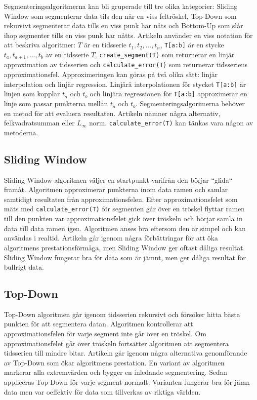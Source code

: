 \documentclass{article}
\newcommand{\tssubset}{\texttt{T[a:b]}}
\newcommand{\csegment}{\texttt{create_segment(T)}}
\newcommand{\calcerr}{\texttt{calculate_error(T)}}
\begin{document}
Segmenteringsalgoritmerna kan bli gruperade till tre olika kategorier: Sliding Window som segmenterar data tils den når en viss feltröskel, Top-Down som rekursivt segmenterar data tills en viss punk har nåts och Bottom-Up som slår ihop segmenter tills en viss punk har nåtts. Artikeln använder en viss notation för att beskriva algoritmer: $T$ är en tidsserie $t_1, t_2, ..., t_n$, \tssubset{} är en stycke $t_a, t_{a+1}, ..., t_b$ av en tidsserie $T$, \csegment{} som returnerar en linjär approximation av tidsserien och \calcerr{} som returnerar tidsseriens approximationsfel. Approximeringen kan göras på två olika sätt: linjär interpolation och linjär regression. Linjärä interpolationen för stycket \tssubset{} är linjen som kopplar $t_a$ och $t_b$ och linjära regressionen för \tssubset{} approximerar en linje som passar punkterna mellan $t_a$ och $t_b$. Segmenteringsalgorimerna behöver en metod för att evaluera resultaten. Artikeln nämner några alternativ, felkvadratsumman eller $L_\infty$ norm. \calcerr{} kan tänkas vara någon av metoderna.
\bigskip

\subsection{Sliding Window}

Sliding Window algoritmen väljer en startpunkt varifrån den börjar ``glida`` framåt. Algoritmen approximerar punkterna inom data ramen och samlar samtidigt resultaten från approximationsfelen. Efter approximationsfelet som mäts med \calcerr{} för segmenten går över en tröskel flyttar ramen till den punkten var approximationsfelet gick över tröskeln och börjar samla in data till data ramen igen. Algoritmen anses bra eftersom den är simpel och kan användas i realtid. Artikeln går igenom några förbättringar för att öka algoritmens prestationsförmåga, men Sliding Window ger oftast dåliga resultat. Sliding Window fungerar bra för data som är jämnt, men ger dåliga resultat för bullrigt data.

\subsection{Top-Down}

Top-Down algoritmen går igenom tidsserien rekursivt och försöker hitta bästa punkten för att segmentera datan. Algoritmen kontrollerar att approximationsfelen för varje segment inte går över en tröskel. Om approximationsfelet går över tröskeln fortsätter algoritmen att segmentera tidsserien till mindre bitar. Artikeln går igenom några alternativa genomförande av Top-Down som ökar algoritmens prestation. En variant av algoritmen markerar alla extremvärden och bygger en inledande segmentering. Sedan appliceras Top-Down för varje segment normalt. Varianten fungerar bra för jämn data men var oeffektiv för data som tillverkas av riktiga världen.
\end{document}
